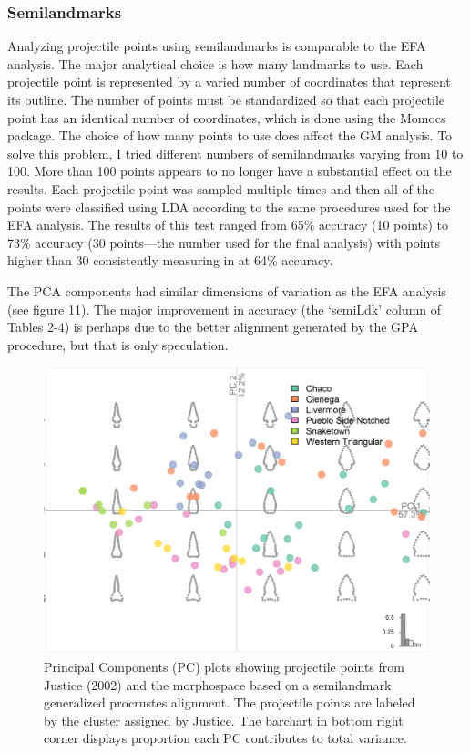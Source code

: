 \documentclass[letterpaper]{article}
\begin{document}
\hypertarget{semilandmarks}{%
\subsubsection*{Semilandmarks}\label{semilandmarks}}

Analyzing projectile points using semilandmarks is comparable to the EFA analysis. The major analytical choice is how many landmarks to use. Each projectile point is represented by a varied number of coordinates that represent its outline. The number of points must be standardized so that each projectile point has an identical number of coordinates, which is done using the Momocs package. The choice of how many points to use does affect the GM analysis. To solve this problem, I tried different numbers of semilandmarks varying from 10 to 100. More than 100 points appears to no longer have a substantial effect on the results. Each projectile point was sampled multiple times and then all of the points were classified using LDA according to the same procedures used for the EFA analysis. The results of this test ranged from 65\% accuracy (10 points) to 73\% accuracy (30 points---the number used for the final analysis) with points higher than 30 consistently measuring in at 64\% accuracy.

The PCA components had similar dimensions of variation as the EFA analysis (see figure 11). The major improvement in accuracy (the `semiLdk' column of Tables 2-4) is perhaps due to the better alignment generated by the GPA procedure, but that is only speculation.

\begin{figure}
\includegraphics[width=1\linewidth]{figures/JusticeSLDKPCA} \caption{Principal Components (PC) plots showing projectile points from Justice (2002) and the morphospace based on a semilandmark generalized procrustes alignment. The projectile points are labeled by the cluster assigned by Justice. The barchart in bottom right corner displays proportion each PC contributes to total variance.}\label{fig:JusticeSLDKPCA}
\end{figure}
\end{document}
